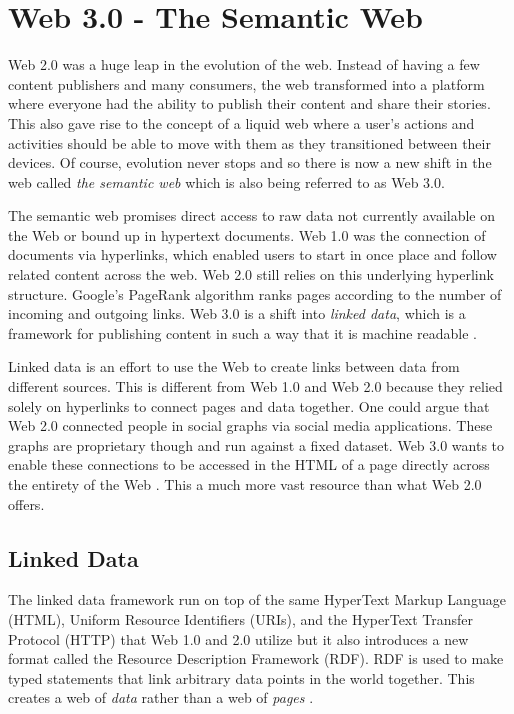 \documentclass[12pt]{article}
\begin{document}
\section{Web 3.0 - The Semantic Web}
Web 2.0 was a huge leap in the evolution of the web.  Instead of having a few content publishers and many consumers, the web transformed into a platform where everyone had the ability to publish their content and share their stories.  This also gave rise to the concept of a liquid web where a user's actions and activities should be able to move with them as they transitioned between their devices.  Of course, evolution never stops and so there is now a new shift in the web called \textit{the semantic web} which is also being referred to as Web 3.0.

The semantic web promises direct access to raw data not currently available on the Web or bound up in hypertext documents.  Web 1.0 was the connection of documents via hyperlinks, which enabled users to start in once place and follow related content across the web.  Web 2.0 still relies on this underlying hyperlink structure.  Google's PageRank algorithm ranks pages according to the number of incoming and outgoing links.  Web 3.0 is a shift into \textit{linked data}, which is a framework for publishing content in such a way that it is machine readable \cite{Heath2011}.

Linked data is an effort to use the Web to create links between data from different sources.   This is different from Web 1.0 and Web 2.0 because they relied solely on hyperlinks to connect pages and data together.  One could argue that Web 2.0 connected people in social graphs via social media applications.  These graphs are proprietary though and run against a fixed dataset.  Web 3.0 wants to enable these connections to be accessed in the HTML of a page directly across the entirety of the Web \cite{Heath2011}.  This a much more vast resource than what Web 2.0 offers.

\subsection{Linked Data}
The linked data framework run on top of the same HyperText Markup Language (HTML), Uniform Resource Identifiers (URIs), and the HyperText Transfer Protocol (HTTP) that Web 1.0 and 2.0 utilize but it also introduces a new format called the Resource Description Framework (RDF).  RDF is used to make typed statements that link arbitrary data points in the world together.  This creates a web of \textit{data} rather than a web of \textit{pages} \cite{Heath2011}\cite{archer}\cite{w3c_semantic_web}.
\end{document}
